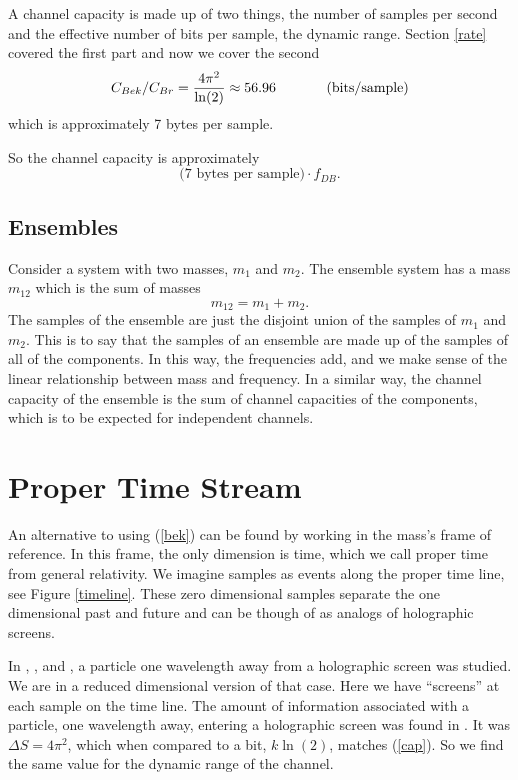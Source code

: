 \documentclass[12pt,a4paper]{article}
\begin{document}
A channel capacity is made up of two things, the number of samples per second and the effective number of bits per sample, the dynamic range.  Section \ref{rate} covered the first part and now we cover the second
\begin{equation}
\label{cap}
   C_{Bek} / C_{Br} = \frac{4 \pi^2}{\ln(2)} \approx 56.96 \hspace{0.5 in} (\si[per-mode=symbol]{bits\per sample})
\end{equation}
which is approximately 7 bytes per sample. 

So the channel capacity is approximately
\[
\text{(7 bytes per sample)} \cdot f_{DB}.
\]

\subsection{Ensembles}
Consider a system with two masses, $m_1$ and $m_2$.  The ensemble system has a mass $m_{12}$ which is the sum of masses
\[
m_{12} = m_1 + m_2.
\]
The samples of the ensemble are just the disjoint union of the samples of $m_1$ and $m_2$.   This is to say that the samples of an ensemble are made up of the samples of all of the components.  In this way, the frequencies add, and we make sense of the linear relationship between mass and frequency.  In a similar way, the channel capacity of the ensemble is the sum of channel capacities of the components, which is to be expected for independent channels.

\section{Proper Time Stream}
An alternative to using (\ref{bek}) can be found by working in the mass's frame of reference. In this frame, the only dimension is time, which we call proper time from general relativity.  We imagine samples as events along the proper time line, see Figure \ref{timeline}.  These zero dimensional samples separate the one dimensional past and future and can be though of as analogs of holographic screens.  

In \cite{thrust}, \cite{entropic}, and \cite{bekenstein}, a particle one wavelength away from a holographic screen was studied.  We are in a reduced dimensional version of that case.  Here we have ``screens'' at each sample on the time line.  The amount of information associated with a particle, one wavelength away, entering a holographic screen was found in \cite{thrust}.  It was $\Delta S = 4\pi^2$, which when compared to a bit, $k \ln(2)$, matches (\ref{cap}).  So we find the same value for the dynamic range of the channel.
\end{document}
